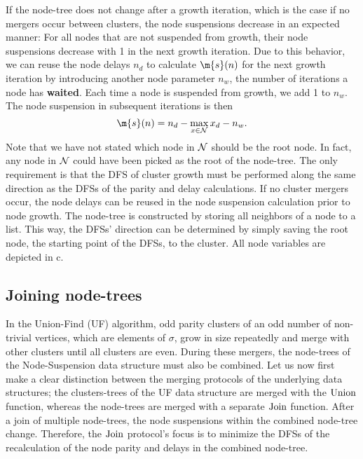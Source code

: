 If the node-tree does not change after a growth iteration, which is the case if no mergers occur between clusters, the node suspensions decrease in an expected manner: For all nodes that are not suspended from growth, their node suspensions decrease with 1 in the next growth iteration. Due to this behavior, we can reuse the node delays $n_d$ to calculate $\m{s}(n)$ for the next growth iteration by introducing another node parameter $n_w$, the number of iterations a node has \textbf{waited}. Each time a node is suspended from growth, we add 1 to $n_w$. The node suspension in subsequent iterations is then
\begin{equation}\label{eq:suspension}
    \m{s}(n) = n_d - \max_{x \in \nset}{x_d} - n_w. 
\end{equation}
Note that we have not stated which node in $\mathcal{N}$ should be the root node. In fact, any node in $\mathcal{N}$ could have been picked as the root of the node-tree. The only requirement is that the DFS of cluster growth must be performed along the same direction as the DFSs of the parity and delay calculations. If no cluster mergers occur, the node delays can be reused in the node suspension calculation prior to node growth. The node-tree is constructed by storing all neighbors of a node to a list. This way, the DFSs' direction can be determined by simply saving the root node, the starting point of the DFSs, to the cluster. All node variables are depicted in c. 


\subsection{Joining node-trees}\label{sec:nodejoin}

In the Union-Find (UF) algorithm, odd parity clusters of an odd number of non-trivial vertices, which are elements of $\sigma$, grow in size repeatedly and merge with other clusters until all clusters are even. During these mergers, the node-trees of the Node-Suspension data structure must also be combined. Let us now first make a clear distinction between the merging protocols of the underlying data structures; the clusters-trees of the UF data structure are merged with the $\operatorname{Union}$ function, whereas the node-trees are merged with a separate $\operatorname{Join}$ function. After a join of multiple node-trees, the node suspensions within the combined node-tree change. Therefore, the $\operatorname{Join}$ protocol's focus is to minimize the DFSs of the recalculation of the node parity and delays in the combined node-tree. 

